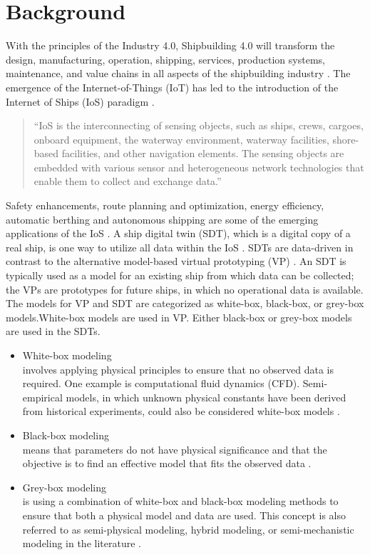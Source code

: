 \section{Background}
With the principles of the Industry 4.0, Shipbuilding 4.0 will transform the design, manufacturing, operation, shipping, services, production systems, maintenance, and value chains in all aspects of the shipbuilding 
industry \cite{stanic_toward_2018}.
The emergence of the Internet-of-Things (IoT) has led to the introduction of the Internet of Ships (IoS) paradigm \cite{liu_internet_2016-1}. 
\begin{quote} 
\vspace{0.1cm}
``IoS is the interconnecting of sensing objects, such as ships, crews, cargoes, onboard equipment, the waterway environment, waterway facilities, shore-based facilities, and other navigation elements. The sensing objects are embedded with various sensor and heterogeneous network technologies that enable them to collect and exchange data.'' 
\vspace{0.1cm}
\end{quote}
Safety enhancements, route planning and optimization, energy efficiency, automatic berthing and autonomous shipping are some of the emerging applications of the IoS \cite{aslam_internet_2020}.
A ship digital twin (SDT), which is a digital copy of a real ship, is one way to utilize all data within the IoS \cite{chen_review_2021}. 
SDTs are data-driven in contrast to the alternative model-based virtual prototyping (VP) \cite{major_framework_2021}. An SDT is typically used as a model for an existing ship from which data can be collected; the VPs are  prototypes for future ships, in which no operational data is available.
The models for VP and SDT are categorized as white-box, black-box, or grey-box models.White-box models are used in VP. Either black-box or grey-box models are used in the SDTs. 
\vspace{5pt}
\begin{itemize}
    \setlength\itemsep{5pt}
    \item White-box modeling \\
    involves applying physical principles to ensure that no observed data is required. One example is computational fluid dynamics (CFD). Semi-empirical models, in which unknown physical constants have been derived from historical experiments, could also be considered white-box models \cite{leifsson_grey-box_2008}.  

    \item Black-box modeling \\
    means that parameters do not have physical significance and that the objective is to find an effective model that fits the observed data \cite{lindskog_tools_1995}.
    
    \item Grey-box modeling \\
    is using a combination of white-box and black-box modeling methods to ensure that both a physical model and data are used. This concept is also referred to as semi-physical modeling, hybrid modeling, or semi-mechanistic modeling in the literature \cite{leifsson_grey-box_2008}. 
\end{itemize}
